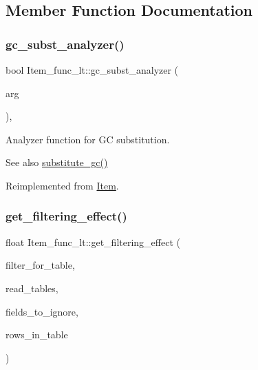 \subsection{Member Function Documentation}
\mbox{\label{classItem__func__lt_aa224df880d91b7ece8f36854f3d2db5d}} 
\subsubsection{\texorpdfstring{gc\+\_\+subst\+\_\+analyzer()}{gc\_subst\_analyzer()}}
{\footnotesize\ttfamily bool Item\+\_\+func\+\_\+lt\+::gc\+\_\+subst\+\_\+analyzer (\begin{DoxyParamCaption}\item[{uchar $\ast$$\ast$}]{arg }\end{DoxyParamCaption})\hspace{0.3cm}{\ttfamily [inline]}, {\ttfamily [virtual]}}

Analyzer function for GC substitution. \begin{DoxySeeAlso}{See also}
\mbox{\hyperlink{group__Query__Optimizer_gaa95a062cdd785687a638e01d7ad85d11}{substitute\+\_\+gc()}} 
\end{DoxySeeAlso}


Reimplemented from \mbox{\hyperlink{classItem_aea5d6f41e9cd5d17d8e6e8d44bee9c3e}{Item}}.

\mbox{\label{classItem__func__lt_a433d163fb3b3c78d1af1695f558da117}} 
\subsubsection{\texorpdfstring{get\+\_\+filtering\+\_\+effect()}{get\_filtering\_effect()}}
{\footnotesize\ttfamily float Item\+\_\+func\+\_\+lt\+::get\+\_\+filtering\+\_\+effect (\begin{DoxyParamCaption}\item[{table\+\_\+map}]{filter\+\_\+for\+\_\+table,  }\item[{table\+\_\+map}]{read\+\_\+tables,  }\item[{const M\+Y\+\_\+\+B\+I\+T\+M\+AP $\ast$}]{fields\+\_\+to\+\_\+ignore,  }\item[{double}]{rows\+\_\+in\+\_\+table }\end{DoxyParamCaption})\hspace{0.3cm}{\ttfamily [virtual]}}

